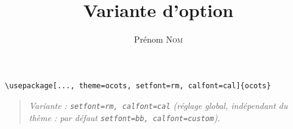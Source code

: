 \documentclass[11pt]{ocots-book}
\title{Variante d'option}
\author{Prénom \textsc{Nom}}
\newcommand{\ocotsvariantnote}[1]{\begin{quote}\itshape Variante : #1\end{quote}}
\begin{document}
\maketitle

\begin{lstlisting}
\usepackage[..., theme=ocots, setfont=rm, calfont=cal]{ocots}
\end{lstlisting}
\ocotsvariantnote{\texttt{setfont=rm, calfont=cal} (r\'eglage global, ind\'ependant du th\`eme : par d\'efaut \texttt{setfont=bb, calfont=custom}).}

\end{document}
